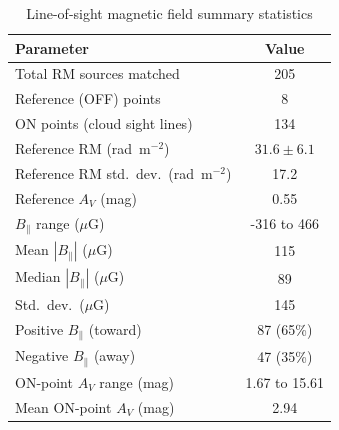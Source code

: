 
\begin{table}[htbp]
\centering
\caption{Line-of-sight magnetic field summary statistics}
\label{tab:blos-summary}
\begin{tabular}{lc}
\toprule
Parameter & Value \\
\midrule
Total RM sources matched & 205 \\
Reference (OFF) points & 8 \\
ON points (cloud sight lines) & 134 \\
\midrule
Reference RM (rad~m$^{-2}$) & $31.6 \pm 6.1$ \\
Reference RM std.\ dev.\ (rad~m$^{-2}$) & 17.2 \\
Reference $A_V$ (mag) & 0.55 \\
\midrule
$B_\parallel$ range ($\mu$G) & -316 to 466 \\
Mean $|B_\parallel|$ ($\mu$G) & 115 \\
Median $|B_\parallel|$ ($\mu$G) & 89 \\
Std.\ dev.\ ($\mu$G) & 145 \\
\midrule
Positive $B_\parallel$ (toward) & 87 (65\%) \\
Negative $B_\parallel$ (away) & 47 (35\%) \\
\midrule
ON-point $A_V$ range (mag) & 1.67 to 15.61 \\
Mean ON-point $A_V$ (mag) & 2.94 \\
\bottomrule
\end{tabular}
\end{table}
